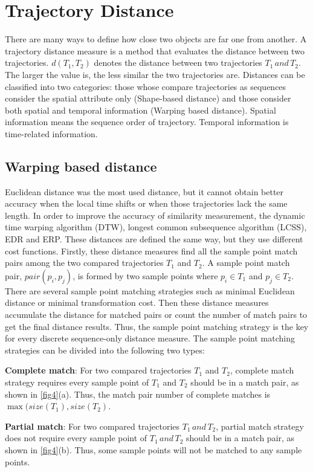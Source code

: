 \documentclass[a4paper, 12pt]{article}
\begin{document}
\section{Trajectory Distance}
There are many ways to define how close two objects are far one from another. A trajectory distance measure is a method that evaluates the distance between two trajectories. $d(T_{1},T_{2})$ denotes the distance between two trajectories $T_{1}\,and\,T_{2}$. The larger the value is, the less similar the two trajectories are. Distances can be classified into two categories: those whose compare trajectories as sequences consider the spatial attribute only (Shape-based distance) and those consider both spatial and temporal information (Warping based distance). Spatial information means the sequence order of trajectory. Temporal information is time-related information.

\subsection{Warping based distance}
Euclidean distance was the most used distance, but it cannot obtain better accuracy when the local time shifts or when those trajectories lack the same length. In order to improve the accuracy of similarity measurement, the dynamic time warping algorithm (DTW), longest common subsequence algorithm (LCSS), EDR and ERP. These distances are defined the same way, but they use different cost functions. Firstly, these distance measures find all the sample point match pairs among the two compared trajectories $T_{1}$ and $T_{2}$. A sample point match pair, $pair(p_{i},p_{j})$, is formed by two sample points where $p_{i} \in T_{1}$ and $p_{j} \in T_{2}$. There are several sample point matching strategies such as minimal Euclidean distance or minimal transformation cost. Then these distance measures accumulate the distance for matched pairs or count the number of match pairs to get the final distance results. Thus, the sample point matching strategy is the key for every discrete sequence-only distance measure. The sample point matching strategies can be divided into the following two types:

\textbf{Complete match}: For two compared trajectories $T_{1}$ and $T_{2}$, complete match strategy requires every sample point of $T_{1}$ and $T_{2}$ should be in a match pair, as shown in \autoref{fig4}(a). Thus, the match pair number of complete matches is $\max(size(T_{1}),size(T_{2})$.

\textbf{Partial match}: For two compared trajectories $T_{1}\,and\,T_{2}$, partial match strategy does not require every sample point of $T_{1}\,and\,T_{2}$ should be in a match pair, as shown in \autoref{fig4}(b). Thus, some sample points will not be matched to any sample points.
\end{document}
